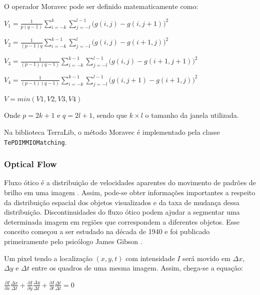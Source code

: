 \documentclass[9pt, a4paper, nofonttune, journal]{IEEEtran}
\begin{document}
O operador Moravec pode ser definido matematicamente como:
    \begin{center}$V_{1}=\frac{1}{p(q-1)}\sum_{i=-k}^k\sum_{j=-l}^{l-1}\bigl(g(i,j)-g(i,j+1)\bigr)^2$    \end{center}
    \begin{center}$V_{2}=\frac{1}{(p-1)q}\sum_{i=-k}^{k-1}\sum_{j=-l}^l\bigl(g(i,j)-g(i+1,j)\bigr)^2$    \end{center}
    \begin{center}$V_{3}=\frac{1}{(p-1)(q-1)}\sum_{i=-k}^{k-1}\sum_{j=-l}^{l-1}\bigl(g(i,j)-g(i+1,j+1)\bigr)^2$\end{center}
    \begin{center}$V_{4}=\frac{1}{(p-1)(q-1)}\sum_{i=-k}^{k-1}\sum_{j=-l}^{l-1}\bigl(g(i,j+1)-g(i+1,j)\bigr)^2$\end{center}
    \begin{center}$V = min(V1,V2,V3,V4)$\end{center}

    Onde $p = 2k + 1$ e $q = 2l + 1$, sendo que $k\times l$ o tamanho da janela utilizada.

Na biblioteca TerraLib, o método Moravec é implementado pela classe \texttt{TePDIMMIOMatching}.

\subsubsection{Optical Flow}
Fluxo ótico é a distribuição de velocidades aparentes do movimento de padrões de brilho em uma imagem \cite{GibsonBook1}. Assim, pode-se obter informações importantes a respeito da distribuição espacial dos objetos visualizados e da taxa de mudança dessa distribuição. Discontinuidades do fluxo ótico podem ajudar a segmentar uma determinada imagem em regiões que correspondem a diferentes objetos. Esse conceito começou a ser estudado na década de 1940 e foi publicado primeiramente pelo psicólogo James Gibson \cite{Gibson1} \cite{OF1}.

Um pixel tendo a localização $(x,y,t)$ com intensidade $I$ será movido em $\Delta x$, $\Delta y$ e $\Delta t$ entre os quadros de uma mesma imagem. Assim, chega-se a equação:

\begin{center}
$\frac{\partial I}{\partial x}\frac{\Delta x}{\Delta t}+\frac{\partial I}{\partial y}\frac{\Delta y}{\Delta t}+\frac{\partial I}{\partial t}\frac{\Delta t}{\Delta t} = 0 $\end{center}
\end{document}
